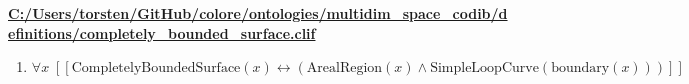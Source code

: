 \documentclass{article}
\begin{document}
\textbf{\url{C:/Users/torsten/GitHub/colore/ontologies/multidim\_space\_codib/definitions/completely\_bounded\_surface.clif}}

\begin{enumerate}
\item $\forall x\;  \left[ \left[ \textrm{CompletelyBoundedSurface}(x) \leftrightarrow \left(\textrm{ArealRegion}(x) \land \textrm{SimpleLoopCurve}(\textrm{boundary}(x))\right) \right] \right]$
\end{enumerate}
\end{document}
